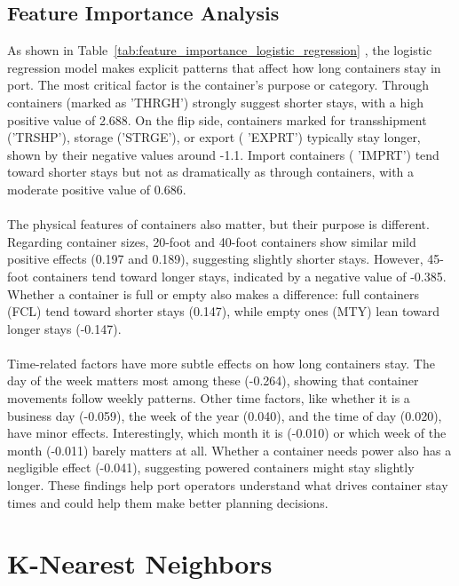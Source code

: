 		\subsection{Feature Importance Analysis}
			As shown in Table~\ref{tab:feature_importance_logistic_regression}
			, the logistic regression model makes explicit patterns that affect how long
			containers stay in port. The most critical factor is the container's purpose or category. Through
			containers (marked as 'THRGH') strongly suggest shorter stays, with a high positive value of 2.688.
			On the flip side, containers marked for transshipment ('TRSHP'), storage ('STRGE'), or export (
			'EXPRT') typically stay longer, shown by their negative values around -1.1. Import containers (
			'IMPRT') tend toward shorter stays but not as dramatically as through containers, with a moderate
			positive value of 0.686.
			\\
			\\
			The physical features of containers also matter, but their purpose is different. Regarding container sizes,
			20-foot and 40-foot containers show similar mild positive effects (0.197 and 0.189), suggesting slightly
			shorter stays. However, 45-foot containers tend toward longer stays, indicated by a negative value of
			-0.385. Whether a container is full or empty also makes a difference: full containers (FCL) tend toward
			shorter stays (0.147), while empty ones (MTY) lean toward longer stays (-0.147).
			\\
			\\
			Time-related factors have more subtle effects on how long containers stay. The day of the week matters most
			among these (-0.264), showing that container movements follow weekly patterns. Other time factors, like
			whether it is a business day (-0.059), the week of the year (0.040), and the time of day (0.020), have
			minor
			effects. Interestingly, which month it is (-0.010) or which week of the month (-0.011) barely matters at
			all. Whether a container needs power also has a negligible effect (-0.041), suggesting powered containers
			might stay slightly longer. These findings help port operators understand what drives container stay times
			and could help them make better planning decisions.


	\section{K-Nearest Neighbors}

